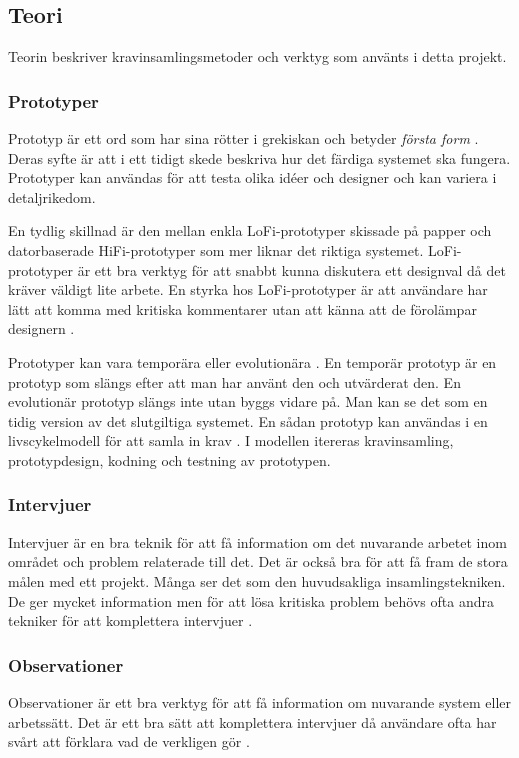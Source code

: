 \subsection{Teori}
Teorin beskriver kravinsamlingsmetoder och  verktyg som använts i detta projekt. 
\subsubsection{Prototyper}
Prototyp är ett ord som har sina rötter i grekiskan och betyder \textit{första form} \cite{Arvola}. Deras syfte är att i ett tidigt skede beskriva hur det färdiga systemet ska fungera. Prototyper kan användas för att testa olika idéer och designer och kan variera i detaljrikedom. 

En tydlig skillnad är den mellan enkla LoFi-prototyper skissade på papper och datorbaserade HiFi-prototyper som mer liknar det riktiga systemet. LoFi-prototyper är ett bra verktyg för att snabbt kunna diskutera ett designval då det kräver väldigt lite arbete. En styrka hos LoFi-prototyper är att användare har lätt att komma med kritiska kommentarer utan att känna att de förolämpar designern \cite{Arvola}.

Prototyper kan vara temporära eller evolutionära \cite{Arvola}. En temporär prototyp är en prototyp som slängs efter att man har använt den och utvärderat den. En evolutionär prototyp slängs inte utan byggs vidare på. Man kan se det som en tidig version av det slutgiltiga systemet. En sådan prototyp kan användas i en livscykelmodell för att samla in krav \cite{Dorfman}. I modellen itereras kravinsamling, prototypdesign, kodning och testning av prototypen.

\subsubsection{Intervjuer}
Intervjuer är en bra teknik för att få information om det nuvarande arbetet inom området och problem relaterade till det. Det är också bra för att få fram de stora målen med ett projekt. Många ser det som den huvudsakliga insamlingstekniken. De ger mycket information men för att lösa kritiska problem behövs ofta andra tekniker för att komplettera intervjuer \cite{Lauesen}. 
\subsubsection{Observationer}
Observationer är ett bra verktyg för att få information om nuvarande system eller arbetssätt. Det är ett bra sätt att komplettera intervjuer då användare ofta har svårt att förklara vad de verkligen gör \cite{Lauesen}. 

